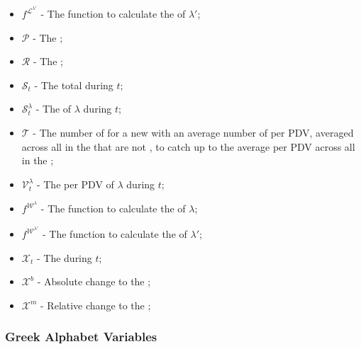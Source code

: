 \documentclass[class=article, crop=false]{standalone}
\begin{document}
\begin{itemize}[topsep=0pt, itemsep=3pt,leftmargin=16pt]
    \item[] $f^{\mathscr{L}^{\lambda'}}$ - The function to calculate the  of $\lambda'$;
    \item[] $\mathscr{P}$ - The ;
    \item[] $\mathscr{R}$ - The ;
    \item[] $\mathscr{S}_{t}$ - The total  during $t$;
    \item[] $\mathscr{S}_{t}^{\lambda}$ - The  of $\lambda$ during $t$;
    \item[] $\mathscr{T}$ - The number of  for a new  with an average number of  per PDV, averaged across all  in the  that are not , to catch up to the average  per PDV across all  in the ;
    \item[] $\mathscr{V}_{t}^{\lambda}$ - The  per PDV of $\lambda$ during $t$;
    \item[] $f^{\mathscr{W}^{\lambda}}$ - The function to calculate the  of $\lambda$;
    \item[] $f^{\mathscr{W}^{\lambda'}}$ - The function to calculate the  of $\lambda'$;
    \item[] $\mathscr{X}_{t}$ - The  during $t$;
    \item[] $\mathscr{X}^{b}$ - Absolute change to the ;
    \item[] $\mathscr{X}^{m}$ - Relative change to the ;
\end{itemize}


\subsubsection{Greek Alphabet Variables}
\end{document}
